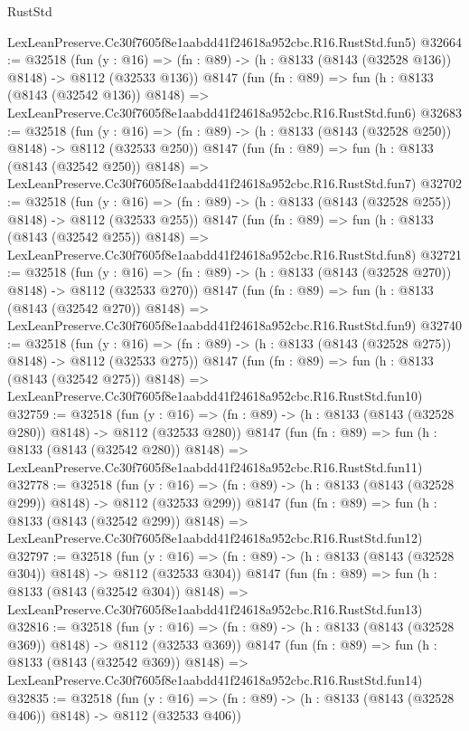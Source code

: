 \begin{lexlean}{RustStd}
\begin{coremodule}
    LexLeanPreserve.Cc30f7605f8e1aabdd41f24618a952cbc.R16.RustStd.fun5)
@32664 := @32518
    (fun (y : @16) => (fn : @89) -> (h : @8133 (@8143 (@32528 @136)) @8148) -> @8112 (@32533 @136))
    @8147
    (fun (fn : @89) =>
    fun (h : @8133 (@8143 (@32542 @136)) @8148) =>
    LexLeanPreserve.Cc30f7605f8e1aabdd41f24618a952cbc.R16.RustStd.fun6)
@32683 := @32518
    (fun (y : @16) => (fn : @89) -> (h : @8133 (@8143 (@32528 @250)) @8148) -> @8112 (@32533 @250))
    @8147
    (fun (fn : @89) =>
    fun (h : @8133 (@8143 (@32542 @250)) @8148) =>
    LexLeanPreserve.Cc30f7605f8e1aabdd41f24618a952cbc.R16.RustStd.fun7)
@32702 := @32518
    (fun (y : @16) => (fn : @89) -> (h : @8133 (@8143 (@32528 @255)) @8148) -> @8112 (@32533 @255))
    @8147
    (fun (fn : @89) =>
    fun (h : @8133 (@8143 (@32542 @255)) @8148) =>
    LexLeanPreserve.Cc30f7605f8e1aabdd41f24618a952cbc.R16.RustStd.fun8)
@32721 := @32518
    (fun (y : @16) => (fn : @89) -> (h : @8133 (@8143 (@32528 @270)) @8148) -> @8112 (@32533 @270))
    @8147
    (fun (fn : @89) =>
    fun (h : @8133 (@8143 (@32542 @270)) @8148) =>
    LexLeanPreserve.Cc30f7605f8e1aabdd41f24618a952cbc.R16.RustStd.fun9)
@32740 := @32518
    (fun (y : @16) => (fn : @89) -> (h : @8133 (@8143 (@32528 @275)) @8148) -> @8112 (@32533 @275))
    @8147
    (fun (fn : @89) =>
    fun (h : @8133 (@8143 (@32542 @275)) @8148) =>
    LexLeanPreserve.Cc30f7605f8e1aabdd41f24618a952cbc.R16.RustStd.fun10)
@32759 := @32518
    (fun (y : @16) => (fn : @89) -> (h : @8133 (@8143 (@32528 @280)) @8148) -> @8112 (@32533 @280))
    @8147
    (fun (fn : @89) =>
    fun (h : @8133 (@8143 (@32542 @280)) @8148) =>
    LexLeanPreserve.Cc30f7605f8e1aabdd41f24618a952cbc.R16.RustStd.fun11)
@32778 := @32518
    (fun (y : @16) => (fn : @89) -> (h : @8133 (@8143 (@32528 @299)) @8148) -> @8112 (@32533 @299))
    @8147
    (fun (fn : @89) =>
    fun (h : @8133 (@8143 (@32542 @299)) @8148) =>
    LexLeanPreserve.Cc30f7605f8e1aabdd41f24618a952cbc.R16.RustStd.fun12)
@32797 := @32518
    (fun (y : @16) => (fn : @89) -> (h : @8133 (@8143 (@32528 @304)) @8148) -> @8112 (@32533 @304))
    @8147
    (fun (fn : @89) =>
    fun (h : @8133 (@8143 (@32542 @304)) @8148) =>
    LexLeanPreserve.Cc30f7605f8e1aabdd41f24618a952cbc.R16.RustStd.fun13)
@32816 := @32518
    (fun (y : @16) => (fn : @89) -> (h : @8133 (@8143 (@32528 @369)) @8148) -> @8112 (@32533 @369))
    @8147
    (fun (fn : @89) =>
    fun (h : @8133 (@8143 (@32542 @369)) @8148) =>
    LexLeanPreserve.Cc30f7605f8e1aabdd41f24618a952cbc.R16.RustStd.fun14)
@32835 := @32518
    (fun (y : @16) => (fn : @89) -> (h : @8133 (@8143 (@32528 @406)) @8148) -> @8112 (@32533 @406))

\end{coremodule}
\end{lexlean}
